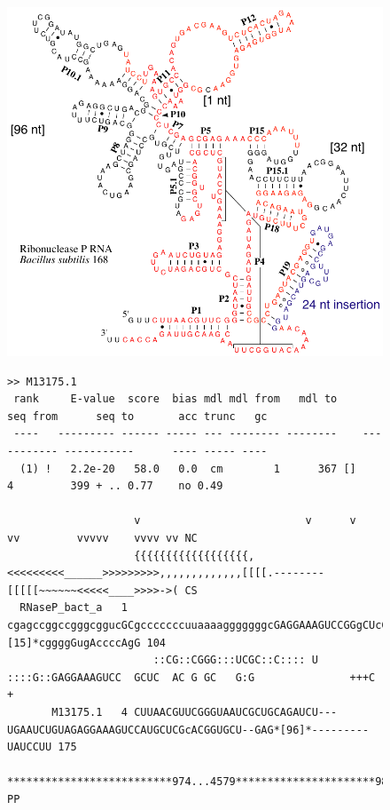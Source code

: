\begin{figure}[tp]
\begin{center}
\includegraphics[scale=0.6]{Figures/rnaseP-bsu-alignment}
\end{center}
\begin{center}
{\scriptsize
\begin{BVerbatim}
>> M13175.1  
 rank     E-value  score  bias mdl mdl from   mdl to       seq from      seq to       acc trunc   gc
 ----   --------- ------ ----- --- -------- --------    ----------- -----------      ---- ----- ----
  (1) !   2.2e-20   58.0   0.0  cm        1      367 []           4         399 + .. 0.77    no 0.49

                    v                          v      v                                  vv         vvvvv    vvvv vv NC
                    {{{{{{{{{{{{{{{{{{,<<<<<<<<<______>>>>>>>>>,,,,,,,,,,,,,[[[[.--------[[[[[~~~~~~<<<<<____>>>>->( CS
  RNaseP_bact_a   1 cgagccggccgggcggucGCgcccccccuuaaaagggggggcGAGGAAAGUCCGGgCUcC.AcAGGgCAggguG*[15]*cggggGugAccccAgG 104
                       ::CG::CGGG:::UCGC::C:::: U      ::::G::GAGGAAAGUCC  GCUC  AC G GC   G:G               +++C + 
       M13175.1   4 CUUAACGUUCGGGUAAUCGCUGCAGAUCU---UGAAUCUGUAGAGGAAAGUCCAUGCUCGcACGGUGCU--GAG*[96]*---------UAUCCUU 175
                    **************************974...4579**********************98788777776..555...8...........3444468 PP


\end{BVerbatim}}
\end{center}
\end{figure}
